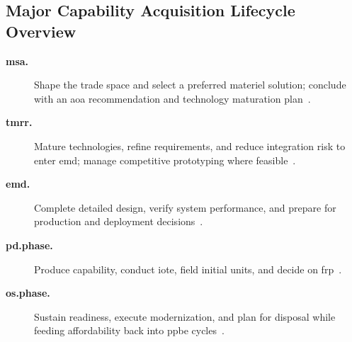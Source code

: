 \documentclass[../main.tex]{subfiles}
\begin{document}
\subsection{Major Capability Acquisition Lifecycle Overview}
\begin{description}
  \item[\textbf{\ac{msa}.}] Shape the trade space and select a preferred materiel solution; conclude with an \ac{aoa} recommendation and technology maturation plan~\autocite{DoDI5000-85}.
  \item[\textbf{\ac{tmrr}.}] Mature technologies, refine requirements, and reduce integration risk to enter \ac{emd}; manage competitive prototyping where feasible~\autocite{DoDI5000-85}.
  \item[\textbf{\ac{emd}.}] Complete detailed design, verify system performance, and prepare for production and deployment decisions~\autocite{DoDI5000-85}.
  \item[\textbf{\ac{pd.phase}.}] Produce capability, conduct \ac{iote}, field initial units, and decide on \ac{frp}~\autocite{DoDI5000-85}.
  \item[\textbf{\ac{os.phase}.}] Sustain readiness, execute modernization, and plan for disposal while feeding affordability back into \ac{ppbe} cycles~\autocite{DoDI5000-85}.
\end{description}
\end{document}
